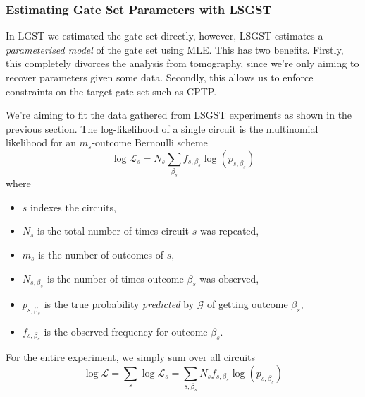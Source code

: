 \subsubsection{Estimating Gate Set Parameters with LSGST}

In \ac{LGST} we estimated the gate set directly, however, \ac{LSGST} estimates a
\textit{parameterised model} of the gate set using \ac{MLE}. This has two benefits. Firstly, this
completely divorces the analysis from tomography, since we're only aiming to recover parameters
given some data. Secondly, this allows us to enforce constraints on the target gate set such as
\ac{CPTP}.

We're aiming to fit the data gathered from \ac{LSGST} experiments as shown in the previous section.
The log-likelihood of a single circuit is the multinomial likelihood for an $m_s$-outcome Bernoulli
scheme
\begin{equation}
    \log \mathcal{L}_s = N_s \sum_{\beta_s} f_{s, \beta_s} \log(p_{s, \beta_s})
\end{equation}
where 
\begin{itemize}
    \item $s$ indexes the circuits,
    \item $N_s$ is the total number of times circuit $s$ was repeated,
    \item $m_s$ is the number of outcomes of $s$,
    \item $N_{s, \beta_s}$ is the number of times outcome $\beta_s$ was observed,
    \item $p_{s, \beta_s}$ is the true probability \textit{predicted} by $\mathcal{G}$ of getting
    outcome $\beta_s$,
    \item $f_{s, \beta_s}$ is the observed frequency for outcome $\beta_s$.
\end{itemize}
For the entire experiment, we simply sum over all circuits
\begin{equation}
    \log \mathcal{L} = \sum_s \log \mathcal{L}_s = \sum_{s, \beta_s} N_s f_{s, \beta_s} \log(p_{s, \beta_s})
\end{equation}

